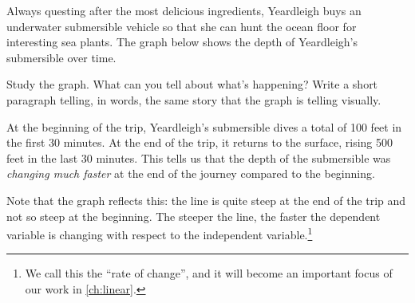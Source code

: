\begin{boxedexplore}
\end{boxedexplore}

\begin{boxedexplore}
Always questing after the most delicious ingredients, Yeardleigh buys an underwater submersible vehicle so that she can hunt the ocean floor for interesting sea plants. The graph below shows the depth of Yeardleigh's submersible over time.

Study the graph. What can you tell about what's happening? Write a short paragraph telling, in words, the same story that the graph is telling visually.

\begin{center}
\end{center}
\end{boxedexplore}

At the beginning of the trip, Yeardleigh's submersible dives a total of 100 feet in the first 30 minutes. At the end of the trip, it returns to the surface, rising 500 feet in the last 30 minutes. This tells us that the depth of the submersible was \textit{changing much faster} at the end of the journey compared to the beginning.

Note that the graph reflects this: the line is quite steep at the end of the trip and not so steep at the beginning. The steeper the line, the faster the dependent variable is changing with respect to the independent variable.\footnote{We call this the ``rate of change'', and it will become an important focus of our work in \cref{ch:linear}.}

